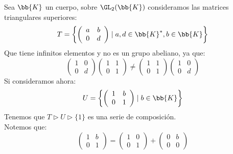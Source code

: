 \begin{ejemplo}
    Sea $\bb{K}$ un cuerpo, sobre $\GL_2(\bb{K})$ consideramos las matrices triangulares superiores:
    \begin{equation*}
        T = \left\{\left(\begin{array}{cc}
            a & b \\
            0 & d 
        \end{array}\right) \mid a,d\in \bb{K}^\ast, b\in \bb{K}\right\}
    \end{equation*}
    Que tiene infinitos elementos y no es un grupo abeliano, ya que:
    \begin{equation*}
        \left(\begin{array}{cc}
            1 & 0 \\
            0 & d 
        \end{array}\right)\left(\begin{array}{cc}
            1 & 1 \\
            0 & 1 
        \end{array}\right) \neq \left(\begin{array}{cc}
            1 & 1 \\
            0 & 1 
        \end{array}\right)\left(\begin{array}{cc}
            1 & 0 \\
            0 & d 
        \end{array}\right)
    \end{equation*}
    Si consideramos ahora:
    \begin{equation*}
        U = \left\{\left(\begin{array}{cc}
            1 & b \\
            0 & 1 
        \end{array}\right) \mid b\in \bb{K}\right\}
    \end{equation*}
    Tenemos que $T\rhd U \rhd \{1\}$ es una serie de composición.\\

    \noindent
    Notemos que:
    \begin{equation*}
        \left(\begin{array}{cc}
            1 & b \\
            0 & 1 
        \end{array}\right) = \left(\begin{array}{cc}
            1 & 0 \\
            0 & 1 
        \end{array}\right) + \left(\begin{array}{cc}
            0 & b \\
            0 & 0 
        \end{array}\right)
    \end{equation*}


\end{ejemplo}
